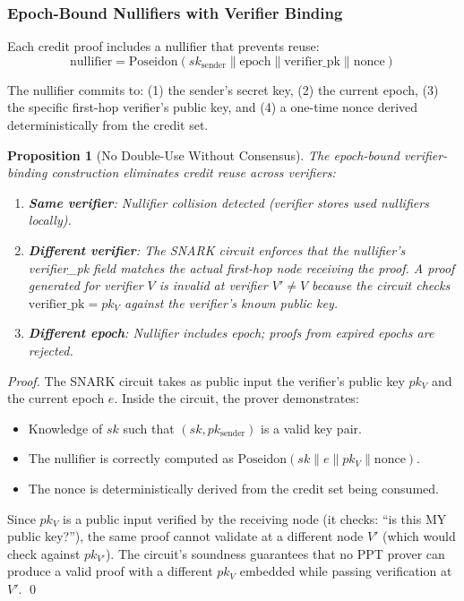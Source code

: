 \documentclass[11pt,a4paper]{article}
\newtheorem{proposition}[theorem]{Proposition}
\begin{document}
\subsubsection{Epoch-Bound Nullifiers with Verifier Binding}
\label{sec:nullifiers}

Each credit proof includes a nullifier that prevents reuse:
\begin{equation}
    \text{nullifier} = \text{Poseidon}(sk_{\text{sender}} \| \text{epoch} \| \text{verifier\_pk} \| \text{nonce})
\end{equation}

The nullifier commits to: (1) the sender's secret key, (2) the current epoch, (3) the specific first-hop verifier's public key, and (4) a one-time nonce derived deterministically from the credit set.

\begin{proposition}[No Double-Use Without Consensus]
\label{prop:no-double-spend}
The epoch-bound verifier-binding construction eliminates credit reuse across verifiers:
\begin{enumerate}[nosep]
    \item \textbf{Same verifier}: Nullifier collision detected (verifier stores used nullifiers locally).
    \item \textbf{Different verifier}: The SNARK circuit enforces that the nullifier's verifier\_pk field matches the actual first-hop node receiving the proof. A proof generated for verifier $V$ is invalid at verifier $V' \neq V$ because the circuit checks $\text{verifier\_pk} = pk_{V}$ against the verifier's known public key.
    \item \textbf{Different epoch}: Nullifier includes epoch; proofs from expired epochs are rejected.
\end{enumerate}
\end{proposition}

\begin{proof}
The SNARK circuit takes as public input the verifier's public key $pk_V$ and the current epoch $e$. Inside the circuit, the prover demonstrates:
\begin{itemize}[nosep]
    \item Knowledge of $sk$ such that $(sk, pk_{\text{sender}})$ is a valid key pair.
    \item The nullifier is correctly computed as $\text{Poseidon}(sk \| e \| pk_V \| \text{nonce})$.
    \item The nonce is deterministically derived from the credit set being consumed.
\end{itemize}
Since $pk_V$ is a public input verified by the receiving node (it checks: ``is this MY public key?''), the same proof cannot validate at a different node $V'$ (which would check against $pk_{V'}$). The circuit's soundness guarantees that no PPT prover can produce a valid proof with a different $pk_V$ embedded while passing verification at $V'$. \qed
\end{proof}
\end{document}
